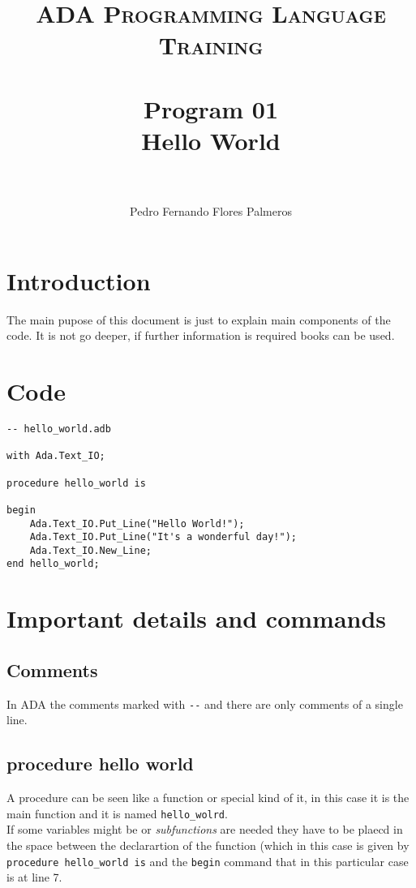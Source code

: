 \documentclass[paper=a4, fontsize=11pt]{scrartcl} %
\title{	
\normalfont \normalsize 
\textsc{ADA Programming Language Training} \\ [25pt] %
\horrule{0.5pt} \\[0.4cm] %
\huge Program 01 \\ Hello World \\ %
\horrule{2pt} \\[0.5cm] %
}
\author{Pedro Fernando Flores Palmeros} %
\date{} %
\numberwithin{equation}{section} %
\numberwithin{figure}{section} %
\numberwithin{table}{section} %
\begin{document}
\maketitle %
 

\section{Introduction}
The main pupose of this document is just to explain main components of the code. It is not go deeper, if further information is required books can be used.

\section{Code}



\begin{lstlisting}
-- hello_world.adb

with Ada.Text_IO;

procedure hello_world is

begin
    Ada.Text_IO.Put_Line("Hello World!");
    Ada.Text_IO.Put_Line("It's a wonderful day!");
    Ada.Text_IO.New_Line;
end hello_world;
\end{lstlisting}

\section{Important details and commands}

\subsection{Comments}
In ADA the comments marked with \verb+--+ and there are only comments of  a single line. 

\subsection{procedure hello world}
A procedure can be seen like a function or special kind of it, in this case it is the main function and it is named \verb+hello_wolrd+.\\

If some variables might be or \textit{subfunctions} are needed they have to be plaecd in the space between the declarartion of the function (which in this case is given by \verb+procedure hello_world is+ and the \verb+begin+ command that in this particular case is at line 7.\\
\end{document}
